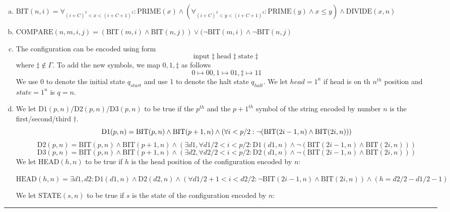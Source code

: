 \documentclass[twoside]{article}
\newenvironment{solution}{{\bf Solution:}}{\hfill\rule{2mm}{2mm}}
\begin{document}
\begin{solution}
\begin{enumerate}[(a)]
	\item $\text{BIT}(n,i) = \forall_{(i+C)^3 < x < (i+C+1)^3}:\text{PRIME}(x)\wedge (\forall_{(i+C)^3 < y < (i+C+1)^3}: \text{PRIME}(y) \wedge x \le y)\wedge \text{DIVIDE}(x,n)$
	\item $\text{COMPARE}(n,m,i,j)=(\text{BIT}(m,i) \wedge \text{BIT}(n,j)) \vee(\neg\text{BIT}(m,i) \wedge \neg\text{BIT}(n,j) $
	\item The configuration can be encoded using form
	$$ \text{input} \ddagger \text{head} \ddagger \text{state} \ddagger$$
	where $\ddagger \notin \Gamma$.
	To add the new symbols, we map $0,1,\ddagger$ as follows
	$$
	0 \longmapsto 00, 1 \longmapsto 01, \ddagger \longmapsto 11
	$$
	We use 0 to denote the initial state $q_{start}$ and use 1 to denote the halt state $q_{halt}$.
	We let $head=1^n$ if head is on th $n^{th}$ position and
	$state=1^n$ is $q=n$.
	\item We let $\text{D1}(p,n)/\text{D2}(p,n)/\text{D3}(p,n)$ to be true if the $p^{th}$ and the $p+1^{th}$ symbol of the string encoded by number $n$ is the first/second/third $\dagger$.
	$$
	\text{D1}(p,n) = \text{BIT}(p,n)\wedge \text{BIT}(p+1,n)\wedge(\forall i<p/2: \neg(\text{BIT}(2i-1,n)\wedge \text{BIT}(2i,n)))\\
	$$
	$$
	\text{D2}(p,n) = \text{BIT}(p,n)\wedge \text{BIT}(p+1,n)\wedge(\exists d1,\forall d1/2<i<p/2: \text{D1}(d1,n)\wedge \neg(\text{BIT}(2i-1,n)\wedge \text{BIT}(2i,n)))
	$$
	$$
	\text{D3}(p,n) = \text{BIT}(p,n)\wedge \text{BIT}(p+1,n)\wedge(\exists d2,\forall d2/2<i<p/2: \text{D2}(d1,n)\wedge \neg(\text{BIT}(2i-1,n)\wedge \text{BIT}(2i,n)))
	$$
	We let HEAD$(h,n)$ to be true if $h$ is the head position of the configuration encoded by $n$:

	$
	\text{HEAD}(h,n)=\exists d1,d2: \text{D1}(d1,n)\wedge\text{D2}(d2,n)\wedge(\forall d1/2+1<i<d2/2:\neg \text{BIT}(2i-1,n) \wedge \text{BIT}(2i,n))\wedge (h=d2/2-d1/2-1)
	$
	
	We let STATE$(s,n)$ to be true if $s$ is the state of the configuration encoded by $n$:


\end{enumerate}
\end{solution}
\end{document}

